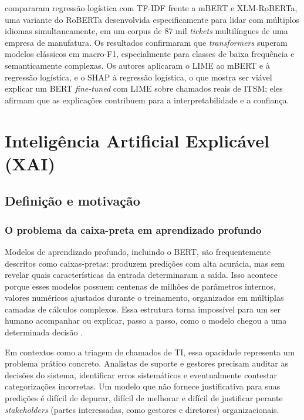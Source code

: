 \documentclass[
    12pt,                %
    openright,           %
    oneside,             %
    a4paper,             %
    english,             %
    brazil               %
]{abntex2}
\begin{document}
 compararam regressão logística com TF-IDF 
frente a mBERT e XLM-RoBERTa, uma variante do RoBERTa desenvolvida 
especificamente para lidar com múltiplos idiomas simultaneamente, 
em um corpus de 87 mil \textit{tickets} multilíngues de uma empresa 
de manufatura. Os resultados confirmaram que \textit{transformers} 
superam modelos clássicos em macro-F1, especialmente para classes 
de baixa frequência e semanticamente complexas. Os autores aplicaram o LIME ao mBERT e à regressão logística, e o SHAP à regressão logística, o que mostra ser viável explicar um BERT \textit{fine-tuned} com LIME sobre chamados reais de ITSM; eles afirmam que as explicações contribuem para a interpretabilidade e a confiança.

\section{Inteligência Artificial Explicável (XAI)}
\label{sec:xai}

\subsection{Definição e motivação}
\label{subsec:xai_definicao}

\subsubsection{O problema da caixa-preta em aprendizado profundo}
\label{subsubsec:xai_caixapreta}

Modelos de aprendizado profundo, incluindo o BERT, são frequentemente descritos como caixas-pretas: produzem predições com alta acurácia, mas sem revelar quais características da entrada determinaram a saída. Isso acontece porque esses modelos possuem centenas de milhões de 
parâmetros internos, valores numéricos ajustados durante o 
treinamento, organizados em múltiplas camadas de cálculos complexos. 
Essa estrutura torna impossível para um ser humano acompanhar ou 
explicar, passo a passo, como o modelo chegou a uma determinada 
decisão \cite{salih2023}.

Em contextos como a triagem de chamados de TI, essa opacidade representa um problema prático concreto. Analistas de suporte e gestores precisam auditar as decisões do sistema, identificar erros sistemáticos e eventualmente contestar categorizações incorretas. Um modelo que não fornece justificativa para suas predições é difícil de depurar, difícil de melhorar e difícil de justificar perante \textit{stakeholders} (partes interessadas, como gestores e diretores) organizacionais.
\end{document}

